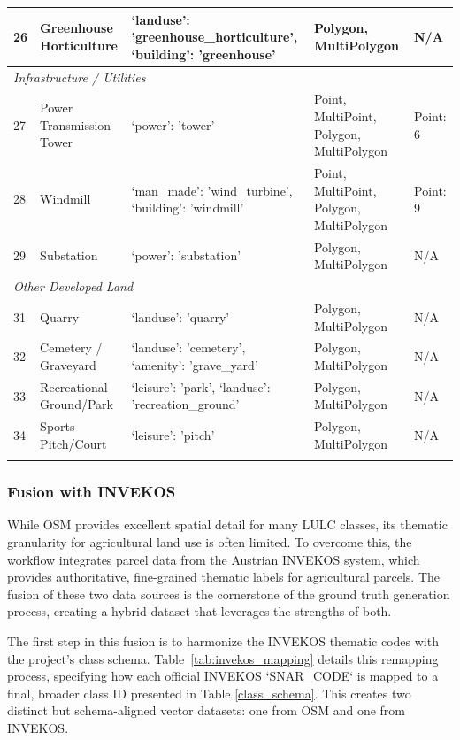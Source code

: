 \documentclass{report}
\begin{document}
\begin{longtable}{@{}p{} p{} p{} p{} p{}@{}}
26 & Greenhouse Horticulture & `landuse': 'greenhouse\_horticulture', `building': 'greenhouse' & Polygon, MultiPolygon & N/A \\
\midrule
\multicolumn{5}{l}{\textit{Infrastructure / Utilities}} \\
\midrule
27 & Power Transmission Tower & `power': 'tower' & Point, MultiPoint, Polygon, MultiPolygon & Point: 6 \\
28 & Windmill & `man\_made': 'wind\_turbine', `building': 'windmill' & Point, MultiPoint, Polygon, MultiPolygon & Point: 9 \\
29 & Substation & `power': 'substation' & Polygon, MultiPolygon & N/A \\
\midrule
\multicolumn{5}{l}{\textit{Other Developed Land}} \\
\midrule
31 & Quarry & `landuse': 'quarry' & Polygon, MultiPolygon & N/A \\
32 & Cemetery / Graveyard & `landuse': 'cemetery', `amenity': 'grave\_yard' & Polygon, MultiPolygon & N/A \\
33 & Recreational Ground/Park & `leisure': 'park', `landuse': 'recreation\_ground' & Polygon, MultiPolygon & N/A \\
34 & Sports Pitch/Court & `leisure': 'pitch' & Polygon, MultiPolygon & N/A \\
\bottomrule
\label{tab:osm_definitions} 
\end{longtable}


\subsubsection{Fusion with INVEKOS}
While OSM provides excellent spatial detail for many LULC classes, its thematic granularity for agricultural land use is often limited. To overcome this, the workflow integrates parcel data from the Austrian INVEKOS system, which provides authoritative, fine-grained thematic labels for agricultural parcels. The fusion of these two data sources is the cornerstone of the ground truth generation process, creating a hybrid dataset that leverages the strengths of both.

The first step in this fusion is to harmonize the INVEKOS thematic codes with the project's class schema. Table~\ref{tab:invekos_mapping} details this remapping process, specifying how each official INVEKOS `SNAR\_CODE` is mapped to a final, broader class ID presented in Table \ref{class_schema}. This creates two distinct but schema-aligned vector datasets: one from OSM and one from INVEKOS.
\end{document}
